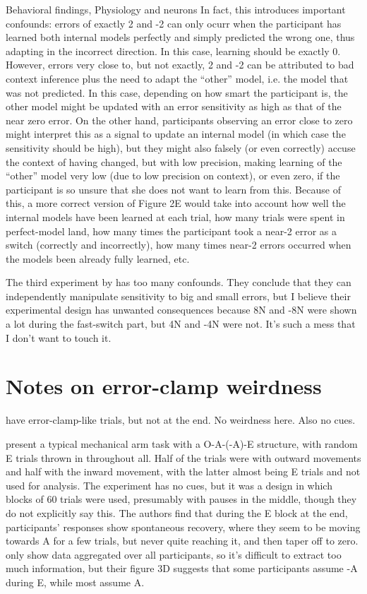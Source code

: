 \documentclass{report}
\begin{document}
\begin{chapter}{Behavioral findings, Physiology and neurons}
In fact, this introduces important confounds: errors of exactly 2 and -2 can
only ocurr when the participant has learned both internal models perfectly and
simply predicted the wrong one, thus adapting in the incorrect direction. In
this case, learning should be exactly 0. However, errors very close to, but not
exactly, 2 and -2 can be attributed to bad context inference plus the need to
adapt the ``other'' model, i.e. the model that was not predicted. In this case,
depending on how smart the participant is, the other model might be updated
with an error sensitivity as high as that of the near zero error. On the other
hand, participants observing an error close to zero might interpret this as a
signal to update an internal model (in which case the sensitivity should be
high), but they might also falsely (or even correctly) accuse the context of
having changed, but with low precision, making learning of the ``other'' model
very low (due to low precision on context), or even zero, if the participant is
so unsure that she does not want to learn from this. Because of this, a more
correct version of Figure 2E would take into account how well the internal
models have been learned at each trial, how many trials were spent in
perfect-model land, how many times the participant took a near-2 error as a
switch (correctly and incorrectly), how many times near-2 errors occurred when
the models been already fully learned, etc.

The third experiment by \cite{Herzfeld_memory_2014} has too many
confounds. They conclude that they can independently manipulate sensitivity to
big and small errors, but I believe their experimental design has unwanted
consequences because 8N and -8N were shown a lot during the fast-switch part,
but 4N and -4N were not. It's such a mess that I don't want to touch it.



\section{Notes on error-clamp weirdness}
\cite{Kojima_Memory_2004} have error-clamp-like trials, but not at the end. No
weirdness here. Also no cues.

\cite{Smith_Interacting_2006} present a typical mechanical arm task with a
O-A-(-A)-E structure, with random E trials thrown in throughout all. Half of
the trials were with outward movements and half with the inward movement, with
the latter almost being E trials and not used for analysis. The experiment has
no cues, but it was a design in which blocks of 60 trials were used, presumably
with pauses in the middle, though they do not explicitly say this. The authors
find that during the E block at the end, participants' responses show
spontaneous recovery, where they seem to be moving towards A for a few trials,
but never quite reaching it, and then taper off to
zero. \cite{Smith_Interacting_2006} only show data aggregated over all
participants, so it's difficult to extract too much information, but their
figure 3D suggests that some participants assume -A during E, while most assume
A.


\end{chapter}
\end{document}
